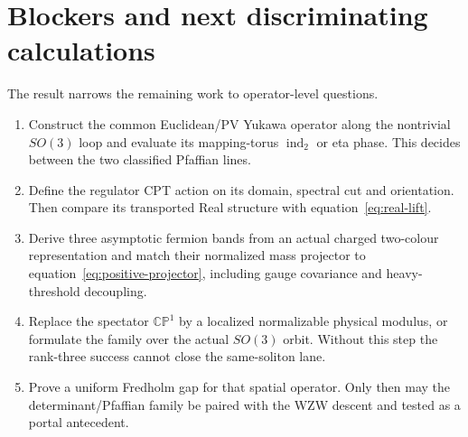 \documentclass[11pt]{article}
\theoremstyle{definition}
\theoremstyle{remark}
\newcommand{\CP}{\mathbb {CP}}
\newcommand{\indtwo}{\operatorname{ind}_{2}}
\begin{document}
\section{Blockers and next discriminating calculations}

The result narrows the remaining work to operator-level questions.
\begin{enumerate}[label=\textbf{B\arabic*.},leftmargin=*]
\item Construct the common Euclidean/PV Yukawa operator along the nontrivial
  \(SO(3)\) loop and evaluate its mapping-torus \(\indtwo\) or eta phase.
  This decides between the two classified Pfaffian lines.
\item Define the regulator CPT action on its domain, spectral cut and
  orientation.  Then compare its transported Real structure with
  equation~\eqref{eq:real-lift}.
\item Derive three asymptotic fermion bands from an actual charged two-colour
  representation and match their normalized mass projector to
  equation~\eqref{eq:positive-projector}, including gauge covariance and
  heavy-threshold decoupling.
\item Replace the spectator \(\CP^1\) by a localized normalizable physical
  modulus, or formulate the family over the actual \(SO(3)\) orbit.  Without
  this step the rank-three success cannot close the same-soliton lane.
\item Prove a uniform Fredholm gap for that spatial operator.  Only then may
  the determinant/Pfaffian family be paired with the WZW descent and tested
  as a portal antecedent.
\end{enumerate}



\end{document}
